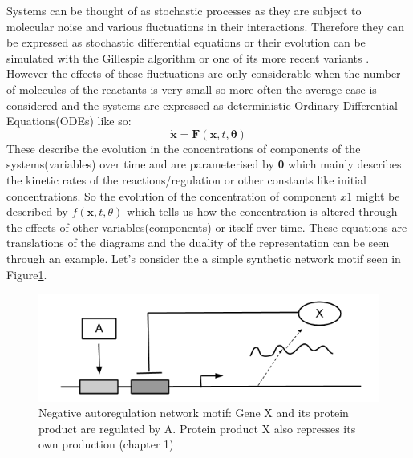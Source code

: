 Systems can be thought of as stochastic processes as they are subject to molecular noise and various fluctuations in their interactions. Therefore they can be expressed as stochastic differential equations or their evolution can be simulated with the Gillespie algorithm \cite[] {gillespie1977exact} or one of its more recent variants \cite[] {gillespie2001approximate, gibson2000efficient}. However the effects of these fluctuations are only considerable when the number of molecules of the reactants is very small so more often the average case is considered and the systems are expressed as deterministic Ordinary Differential Equations(ODEs) like so: 
\begin{equation}
\mathbf{\dot x} = \mathbf{F}(\mathbf{x}, t, \mathbf{\theta})
\end{equation}
 These describe the evolution in the concentrations of components of the systems(variables) over time and are parameterised by $\mathbf{\theta}$ which mainly describes the kinetic rates of the reactions/regulation or other constants like initial concentrations. So the evolution of the concentration of component $x1$ might be described by $f(\mathbf{x}, t, \theta)$ which tells us how the concentration is altered through the effects of other variables(components) or itself over time. These equations are translations of the diagrams and the duality of the representation can be seen through an example. Let's consider the a simple synthetic network motif seen in Figure\ref{fig:simple_motif}. 
\begin{figure}
\centering
\includegraphics[width=0.5\linewidth]{neg_autoregulation}
\caption{Negative autoregulation network motif: Gene X and its protein product are regulated by A. Protein product X also represses its own production \cite[]{alon2007introduction}(chapter 1)}
\label{fig:simple_motif}
\end{figure}
